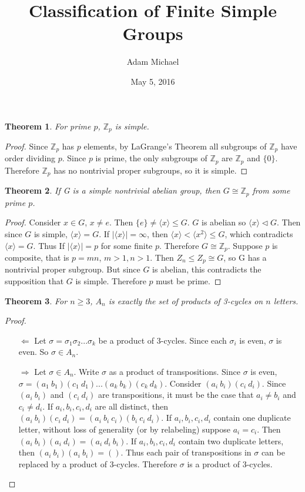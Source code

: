 \documentclass[a4paper]{article}
\title{Classification of Finite Simple Groups}
\author{Adam Michael}
\date{May 5, 2016}
\begin{document}
\maketitle

\newtheorem{theorem}{Theorem}

\begin{theorem}For prime $p$, $\mathbb{Z}_p$ is simple.
\end{theorem}
\begin{proof}
Since $\mathbb{Z}_p$ has $p$ elements, by LaGrange's Theorem all subgroups of $\mathbb{Z}_p$ have order dividing $p$. Since $p$ is prime, the only subgroups of $\mathbb{Z}_p$ are $\mathbb{Z}_p$ and $\{0\}$. Therefore $\mathbb{Z}_p$ has no nontrivial proper subgroups, so it is simple.
\end{proof}

\begin{theorem}
   If G is a simple nontrivial abelian group, then $G \cong \mathbb{Z}_p$ from some prime $p$.
\end{theorem}
\begin{proof}
   Consider $x \in G$, $x \neq e$. Then $\{ e \} \neq \langle x \rangle \le G$. $G$ is abelian so $\langle x \rangle \triangleleft G$. Then since $G$ is simple, $\langle x \rangle = G$. If $|\langle x \rangle| = \infty$, then $\langle x \rangle < \langle x^2 \rangle \leq G$, which contradicts $\langle x \rangle = G$. Thus If $|\langle x \rangle| = p$ for some finite $p$. Therefore $G \cong \mathbb{Z}_p$. Suppose $p$ is composite, that is $p = m n$, $m > 1, n > 1$. Then $Z_n \leq Z_p \cong G$, so G has a nontrivial proper subgroup. But since $G$ is abelian, this contradicts the supposition that $G$ is simple. Therefore $p$ must be prime.
\end{proof}

\begin{theorem}For $n \ge 3$, $A_n$ is exactly the set of products of 3-cycles on $n$ letters.
\end{theorem}
\begin{proof}~
\begin{enumerate}
\item[$\Leftarrow$]
   Let $\sigma = \sigma_1 \sigma_2 ... \sigma_k$ be a product of 3-cycles. Since each $\sigma_i$ is even, $\sigma$ is even. So $\sigma \in A_n$.
\item[$\Rightarrow$]
   Let $\sigma \in A_n$. Write $\sigma$ as a product of transpositions. Since $\sigma$ is even, $\sigma=(a_1\ b_1)(c_1\ d_1)...(a_k\ b_k)(c_k\ d_k)$. Consider $(a_i\ b_i)(c_i\ d_i)$. Since $(a_i\ b_i)$ and $(c_i\ d_i)$ are transpositions, it must be the case that $a_i \ne b_i$ and $c_i \ne d_i$. If $a_i, b_i, c_i, d_i$ are all distinct, then $(a_i\ b_i)(c_i\ d_i) = (a_i\ b_i\ c_i)(b_i\ c_i\ d_i)$. If $a_i, b_i, c_i, d_i$ contain one duplicate letter, without loss of generality (or by relabeling) suppose $a_i = c_i$. Then $(a_i\ b_i)(a_i\ d_i) = (a_i\ d_i\ b_i)$. If $a_i, b_i, c_i, d_i$ contain two duplicate letters, then $(a_i\ b_i)(a_i\ b_i) = ()$. Thus each pair of transpositions in $\sigma$ can be replaced by a product of 3-cycles. Therefore $\sigma$ is a product of 3-cycles.
\end{enumerate}
\end{proof}
\end{document}
